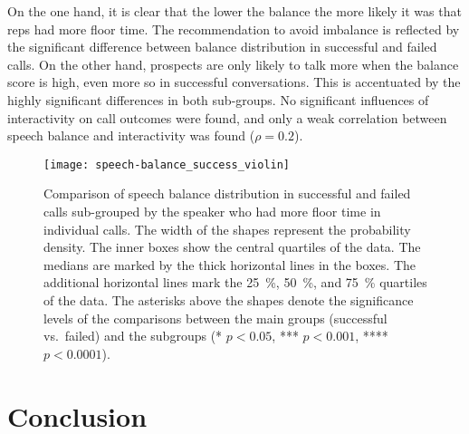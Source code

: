 On the one hand, it is clear that the lower the balance the more likely it was that reps had more floor time.
The recommendation to avoid imbalance is reflected by the significant difference between balance distribution in successful and failed calls.
On the other hand, prospects are only likely to talk more when the balance score is high, even more so in successful conversations.
This is accentuated by the highly significant differences in both sub-groups.
No significant influences of interactivity on call outcomes were found, and only a weak correlation between speech balance and interactivity was found ($\rho = 0.2$).
%
\begin{figure}
	\centering
	\texttt{[image: speech-balance\_success\_violin]}
	\caption[Distribution of speech balance in successful and failed calls]
		{Comparison of speech balance distribution in successful and failed calls sub-grouped by the speaker who had more floor time in individual calls.
		The width of the shapes represent the probability density.
		The inner boxes show the central quartiles of the data.
		The medians are marked by the thick horizontal lines in the boxes.
		The additional horizontal lines mark the \SI{25}{\percent}, \SI{50}{\percent}, and \SI{75}{\percent} quartiles of the data.
		The asterisks above the shapes denote the significance levels of the comparisons between the main groups (successful vs.\ failed) and the subgroups (* $p < 0.05$, *** $p < 0.001$, **** $p < 0.0001$).}
	\label{fig:speech-balance_success_violin}
\end{figure}

\section{Conclusion}
\label{sec:conclusion_hhi}

